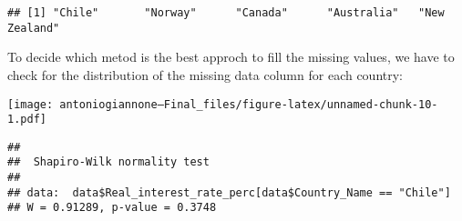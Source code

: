 \documentclass[
]{article}
\newenvironment{Shaded}{\begin{snugshade}}{\end{snugshade}}
\newcommand{\AttributeTok}[1]{\textcolor[rgb]{0.13,0.29,0.53}{#1}}
\newcommand{\DecValTok}[1]{\textcolor[rgb]{0.00,0.00,0.81}{#1}}
\newcommand{\FunctionTok}[1]{\textcolor[rgb]{0.13,0.29,0.53}{\textbf{#1}}}
\newcommand{\NormalTok}[1]{#1}
\newcommand{\SpecialCharTok}[1]{\textcolor[rgb]{0.81,0.36,0.00}{\textbf{#1}}}
\newcommand{\StringTok}[1]{\textcolor[rgb]{0.31,0.60,0.02}{#1}}
\begin{document}
\begin{verbatim}
## [1] "Chile"       "Norway"      "Canada"      "Australia"   "New Zealand"
\end{verbatim}

To decide which metod is the best approch to fill the missing values, we
have to check for the distribution of the missing data column for each
country:

\begin{Shaded}
\end{Shaded}

\texttt{[image: antoniogiannone---Final\_files/figure-latex/unnamed-chunk-10-1.pdf]}

\begin{Shaded}
\end{Shaded}

\begin{verbatim}
## 
##  Shapiro-Wilk normality test
## 
## data:  data$Real_interest_rate_perc[data$Country_Name == "Chile"]
## W = 0.91289, p-value = 0.3748
\end{verbatim}

\begin{Shaded}
\end{Shaded}
\end{document}
